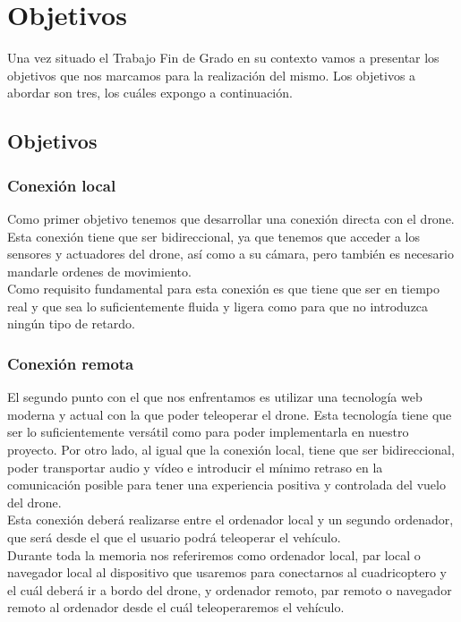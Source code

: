 \chapter{Objetivos}

Una vez situado el Trabajo Fin de Grado en su contexto vamos a presentar los objetivos que nos marcamos para la realización del mismo. Los objetivos a abordar son tres, los cuáles expongo a continuación.

\section{Objetivos}
\subsection{Conexión local}

Como primer objetivo tenemos que desarrollar una conexión directa con el drone. Esta conexión tiene que ser bidireccional, ya que tenemos que acceder a los sensores y actuadores del drone, así como a su cámara, pero también es necesario mandarle ordenes de movimiento.\\

Como requisito fundamental para esta conexión es que tiene que ser en tiempo real y que sea lo suficientemente fluida y ligera como para que no introduzca ningún tipo de retardo.\\


\subsection{Conexión remota}

El segundo punto con el que nos enfrentamos es utilizar una tecnología web moderna y actual con la que poder teleoperar el drone. Esta tecnología tiene que ser lo suficientemente versátil como para poder implementarla en nuestro proyecto. Por otro lado, al igual que la conexión local, tiene que ser bidireccional, poder transportar audio y vídeo e introducir el mínimo retraso en la comunicación posible para tener una experiencia positiva y controlada del vuelo del drone.\\

Esta conexión deberá realizarse entre el ordenador local y un segundo ordenador, que será desde el que el usuario podrá teleoperar el vehículo.\\

Durante toda la memoria nos referiremos como ordenador local, par local o navegador local al dispositivo que usaremos para conectarnos al cuadricoptero y el cuál deberá ir a bordo del drone, y ordenador remoto, par remoto o navegador remoto al ordenador desde el cuál teleoperaremos el vehículo.\\

